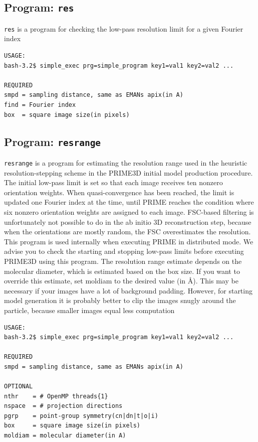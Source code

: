 \documentclass[a4paper,11pt]{article}
\newcommand{\prgname}[1]{\textcolor{NavyBlue}{\texttt{#1}}}
\begin{document}
\subsection{Program: \prgname{res}}
\label{res}
\prgname{res} is a program for checking the low-pass resolution limit for a given Fourier index

\begin{verbatim}
USAGE:
bash-3.2$ simple_exec prg=simple_program key1=val1 key2=val2 ...

REQUIRED
smpd = sampling distance, same as EMANs apix(in A)
find = Fourier index
box  = square image size(in pixels)
\end{verbatim}

\subsection{Program: \prgname{resrange}}
\label{resrange}
\prgname{resrange} is a program for estimating the resolution range used in the heuristic resolution-stepping scheme in the PRIME3D initial model production procedure. The initial low-pass limit is set so that each image receives ten nonzero orientation weights. When quasi-convergence has been reached, the limit is updated one Fourier index at the time, until PRIME reaches the condition where six nonzero orientation weights are assigned to each image. FSC-based filtering is unfortunately not possible to do in the ab initio 3D reconstruction step, because when the orientations are mostly random, the FSC overestimates the resolution. This program is used internally when executing PRIME in distributed mode. We advise you to check the starting and stopping low-pass limits before executing PRIME3D using this program. The resolution range estimate depends on the molecular diameter, which is estimated based on the box size. If you want to override this estimate, set moldiam to the desired value (in \AA{}). This may be necessary if your images have a lot of background padding. However, for starting model generation it is probably better to clip the images snugly around the particle, because smaller images equal less computation

\begin{verbatim}
USAGE:
bash-3.2$ simple_exec prg=simple_program key1=val1 key2=val2 ...

REQUIRED
smpd = sampling distance, same as EMANs apix(in A)

OPTIONAL
nthr    = # OpenMP threads{1}
nspace  = # projection directions
pgrp    = point-group symmetry(cn|dn|t|o|i)
box     = square image size(in pixels)
moldiam = molecular diameter(in A)
\end{verbatim}
\end{document}
